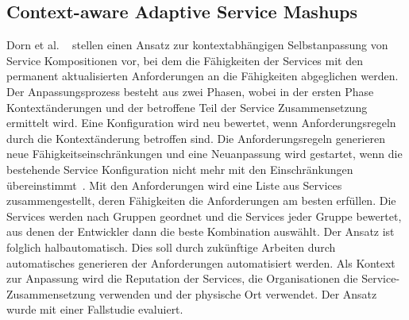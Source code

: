\documentclass[conference,compsoc]{IEEEtran}
\begin{document}
\subsection{Context-aware Adaptive Service Mashups}
Dorn et al. ~\cite{dorn2009context} stellen einen Ansatz zur kontextabhängigen Selbstanpassung von Service Kompositionen vor, bei dem die Fähigkeiten der Services mit den permanent aktualisierten Anforderungen an die Fähigkeiten abgeglichen werden. Der Anpassungsprozess besteht aus zwei Phasen, wobei in der ersten Phase Kontextänderungen und der betroffene Teil der Service Zusammensetzung ermittelt wird. Eine Konfiguration wird neu bewertet, wenn Anforderungsregeln durch die Kontextänderung betroffen sind. Die Anforderungsregeln generieren neue Fähigkeitseinschränkungen und eine Neuanpassung wird gestartet, wenn die bestehende Service Konfiguration nicht mehr mit den Einschränkungen übereinstimmt~\cite{dorn2009context}. Mit den Anforderungen wird eine Liste aus Services zusammengestellt, deren Fähigkeiten die Anforderungen am besten erfüllen. Die Services werden nach Gruppen geordnet und die Services jeder Gruppe bewertet, aus denen der Entwickler dann die beste Kombination auswählt. Der Ansatz ist folglich halbautomatisch. Dies soll durch zukünftige Arbeiten durch automatisches generieren der Anforderungen automatisiert werden.
Als Kontext zur Anpassung wird die Reputation der Services, die Organisationen die Service-Zusammensetzung verwenden und der physische Ort verwendet.
Der Ansatz wurde mit einer Fallstudie evaluiert.
\end{document}
